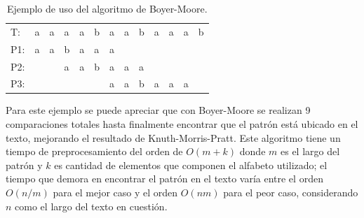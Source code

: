 \begin{table}[h]
\centering
\label{my-label7}
\begin{tabular}{lllllllllllll}
\cline{2-13}
\multicolumn{1}{l|}{T:}  & \multicolumn{1}{l|}{a}                         & \multicolumn{1}{l|}{a}                         & \multicolumn{1}{l|}{a}                         & \multicolumn{1}{l|}{a}                         & \multicolumn{1}{l|}{b}                         & \multicolumn{1}{l|}{a}                         & \multicolumn{1}{l|}{a}                         & \multicolumn{1}{l|}{b}                         & \multicolumn{1}{l|}{a}                         & \multicolumn{1}{l|}{a}                         & \multicolumn{1}{l|}{a}                         & \multicolumn{1}{l|}{b} \\ \cline{2-13} 
\multicolumn{1}{l}{P1:} & \multicolumn{1}{l}{a} & \multicolumn{1}{l}{a} & \multicolumn{1}{l}{b} & \multicolumn{1}{l}{a} & \multicolumn{1}{l}{\cellcolor[HTML]{FD6864}a} & \multicolumn{1}{l}{\cellcolor[HTML]{9AFF99}a} &                    &       &                       &        &                       &                        \\
P2:                      &                       &  & \multicolumn{1}{l}{a} & \multicolumn{1}{l}{a} & \multicolumn{1}{l}{b} & \multicolumn{1}{l}{a} & \multicolumn{1}{l}{a} & \multicolumn{1}{l}{\cellcolor[HTML]{FD6864}a} &              &               &                     &                        \\
P3:                      &                       &                       &                        &                      &  & \multicolumn{1}{l}{\cellcolor[HTML]{9AFF99}a} & \multicolumn{1}{l}{\cellcolor[HTML]{9AFF99}a} & \multicolumn{1}{l}{\cellcolor[HTML]{9AFF99}b} & \multicolumn{1}{l}{\cellcolor[HTML]{9AFF99}a} & \multicolumn{1}{l}{\cellcolor[HTML]{9AFF99}a} & \multicolumn{1}{l}{\cellcolor[HTML]{9AFF99}a} &                        \\
\end{tabular}
\caption{Ejemplo de uso del algoritmo de Boyer-Moore.}
\end{table}

Para este ejemplo se puede apreciar que con Boyer-Moore se realizan 9 comparaciones totales hasta finalmente encontrar que el patrón está ubicado en el texto, mejorando el resultado de Knuth-Morris-Pratt.
Este algoritmo tiene un tiempo de preprocesamiento del orden de $O(m+k)$ donde $m$ es el largo del patrón y $k$ es cantidad de elementos que componen el alfabeto utilizado; el tiempo que demora en encontrar el patrón en el texto varía entre el orden $O(n/m)$ para el mejor caso y el orden $O(nm)$ para el peor caso, considerando $n$ como el largo del texto en cuestión.

